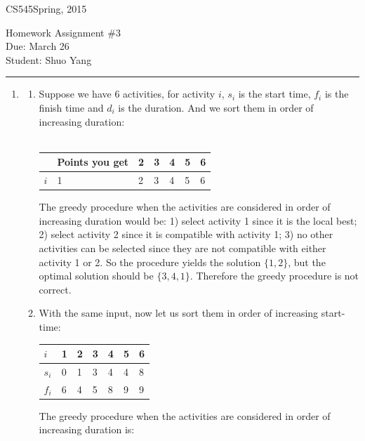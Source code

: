 \documentclass[11pt]{article}
\def\CourseCode{CS545}
\def\AssignmentNo{3}
\def\DateHandedOut{Spring, 2015}
\def\DateDue{March 26}
\def\Author{Shuo Yang}
\begin{document}
\noindent

\CourseCode \hfill \DateHandedOut

\begin{center}
Homework Assignment \#\AssignmentNo\\
Due: \DateDue\\
Student: \Author\\
\end{center}

\hrule\smallskip

\begin{enumerate}

\item %
\begin{enumerate} %
\item Suppose we have 6 activities, for activity $i$, $s_i$ is the
  start time, $f_i$ is the finish time and $d_i$ is the duration. 
And we sort them in order of increasing duration:\\\\
\begin{tabular}{ l | l | l }
   & Points you get & 2 & 3 & 4 & 5 & 6\\ \hline
  $i$ & 1 & 2 & 3 & 4 & 5 & 6\\ \hline
\end{tabular}

The greedy procedure when the activities are considered in order of
increasing duration would be: 1) select activity 1 since it is the
local best; 2) select activity 2 since it is compatible with activity
1; 3) no other activities can be selected since they are not
compatible with either activity 1 or 2. So the procedure yields the
solution $\{1,2\}$, but the optimal solution should be
$\{3,4,1\}$. Therefore the greedy procedure is not correct.

\item With the same input, now let us sort them in order of increasing
  start-time:\\

\begin{tabular}{ l | l l l l l l }
  $i$ & 1 & 2 & 3 & 4 & 5 & 6\\ \hline
  $s_i$ & 0 & 1 & 3 & 4 & 4 & 8\\
  $f_i$ & 6 & 4 & 5 & 8 & 9 & 9\\
\end{tabular}

The greedy procedure when the activities are considered in order of
increasing duration is:


\end{enumerate}
\end{enumerate}
\end{document}
